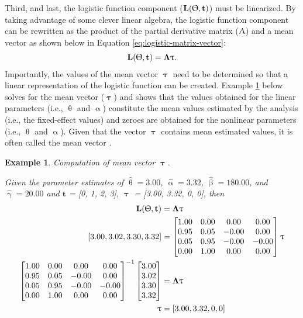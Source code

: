 \documentclass[
12pt, %
twoside,
english]{guelphthesis}
\newtheorem{example}{Example}
\begin{document}
Third, and last, the logistic function component (\(\mathbf{L(\Uptheta, t)}\)) must be linearized. By taking advantage of some clever linear algebra, the logistic function component can be rewritten as the product of the partial derivative matrix (\(\mathbf{\Uplambda}\)) and a mean vector \autocites[\(\mathbf{\uptau}\);][]{shapiro1987,browne1993} as shown below in Equation \ref{eq:logistic-matrix-vector}:
\begin{align}
 \mathbf{L(\Uptheta, t)} = \mathbf{\Lambda\uptau}.
\label{eq:logistic-matrix-vector}
\end{align}
\noindent Importantly, the values of the mean vector \(\mathbf{\uptau}\) need to be determined so that a linear representation of the logistic function can be created. Example \ref{exm:tau-vector} below solves for the mean vector (\(\mathbf{\uptau}\)) and shows that the values obtained for the linear parameters (i.e., \(\uptheta\) and \(\upalpha\)) constitute the mean values estimated by the analysis (i.e., the fixed-effect values) and zeroes are obtained for the nonlinear parameters (i.e., \(\uptheta\) and \(\upalpha\)). Given that the vector \(\mathbf{\uptau}\) contains mean estimated values, it is often called the mean vector \autocite{blozis2004,preacher2015}.
\begin{example}
\protect\hypertarget{exm:tau-vector}{}\label{exm:tau-vector}Computation of mean vector \(\mathbf{\uptau}\).

\noindent \textup{Given the parameter estimates of $\hat{\uptheta} = 3.00$, $\hat{\upalpha} = 3.32$, $\hat{\upbeta} = 180.00$, and $\hat{\upgamma} = 20.00$ and $\mathbf{t}$ = [0, 1, 2, 3], $\mathbf{\uptau}$ = [3.00, 3.32, 0, 0], then }
\begin{align*}
\mathbf{L(\Uptheta, t)} &= \mathbf{\Lambda\uptau} \\ 
[3.00, 3.02, 3.30, 3.32] &= \begin{bmatrix}
1.00 & 0.00 & 0.00  & 0.00 \\ 
0.95  & 0.05 & -0.00 & 0.00 \\ 
0.05 & 0.95 & -0.00 & -0.00 \\ 
0.00 & 1.00  & 0.00 & 0.00 \\
\end{bmatrix} \mathbf{\uptau} \\ 
\begin{bmatrix}
1.00 & 0.00 & 0.00  & 0.00 \\ 
0.95  & 0.05 & -0.00 & 0.00 \\ 
0.05 & 0.95 & -0.00 & -0.00 \\ 
0.00 & 1.00  & 0.00 & 0.00 \\
\end{bmatrix}^{-1}
\begin{bmatrix} 
3.00 \\ 3.02 \\ 3.30 \\ 3.32
\end{bmatrix} &=  \mathbf{\Lambda\uptau} \\ 
 \mathbf{\uptau} &= [3.00, 3.32, 0, 0]\\
\end{align*}
\vspace*{-25mm}

\noindent \hrulefill
\end{example}
\end{document}
